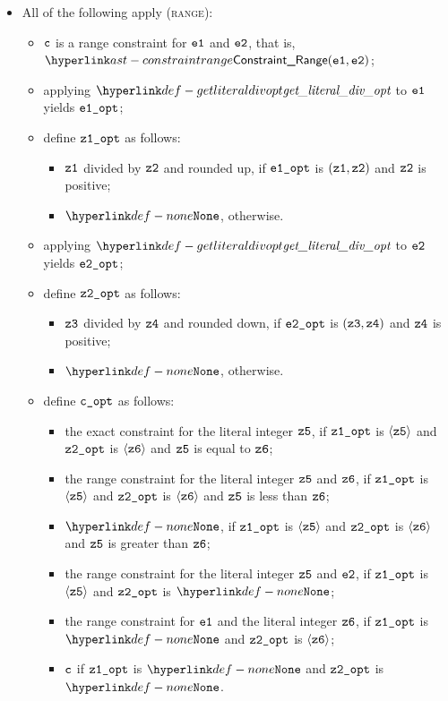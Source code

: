 \begin{itemize}
  \item All of the following apply (\textsc{range}):
  \begin{itemize}
    \item $\texttt{c}$ is a range constraint for $\texttt{e1}$ and $\texttt{e2}$, that is, $\ConstraintRange(\veone, \vetwo)$;
    \item applying $\getliteraldivopt$ to $\texttt{e1}$ yields $\texttt{e1\_opt}$;
    \item define $\texttt{z1\_opt}$ as follows:
    \begin{itemize}
      \item $\texttt{z1}$ divided by $\texttt{z2}$ and rounded up, if $\texttt{e1\_opt}$ is $(\texttt{z1}, \texttt{z2})$ and $\texttt{z2}$ is positive;
      \item $\None$, otherwise.
    \end{itemize}
    \item applying $\getliteraldivopt$ to $\texttt{e2}$ yields $\texttt{e2\_opt}$;
    \item define $\texttt{z2\_opt}$ as follows:
    \begin{itemize}
      \item $\texttt{z3}$ divided by $\texttt{z4}$ and rounded down, if $\texttt{e2\_opt}$ is $(\texttt{z3}, \texttt{z4})$ and $\texttt{z4}$ is positive;
      \item $\None$, otherwise.
    \end{itemize}
    \item define $\texttt{c\_opt}$ as follows:
    \begin{itemize}
      \item the exact constraint for the literal integer $\texttt{z5}$, if $\texttt{z1\_opt}$ is $\langle\texttt{z5}\rangle$ and $\texttt{z2\_opt}$ is $\langle\texttt{z6}\rangle$ and $\texttt{z5}$ is equal to $\texttt{z6}$;
      \item the range constraint for the literal integer $\texttt{z5}$ and $\texttt{z6}$, if $\texttt{z1\_opt}$ is $\langle\texttt{z5}\rangle$ and $\texttt{z2\_opt}$ is $\langle\texttt{z6}\rangle$ and $\texttt{z5}$ is less than $\texttt{z6}$;
      \item $\None$, if $\texttt{z1\_opt}$ is $\langle\texttt{z5}\rangle$ and $\texttt{z2\_opt}$ is $\langle\texttt{z6}\rangle$ and $\texttt{z5}$ is greater than $\texttt{z6}$;
      \item the range constraint for the literal integer $\texttt{z5}$ and $\texttt{e2}$, if $\texttt{z1\_opt}$ is $\langle\texttt{z5}\rangle$ and $\texttt{z2\_opt}$ is $\None$;
      \item the range constraint for $\texttt{e1}$ and the literal integer $\texttt{z6}$, if $\texttt{z1\_opt}$ is $\None$ and $\texttt{z2\_opt}$ is $\langle\texttt{z6}\rangle$;
      \item $\texttt{c}$ if $\texttt{z1\_opt}$ is $\None$ and $\texttt{z2\_opt}$ is $\None$.
    \end{itemize}
  \end{itemize}
\end{itemize}

